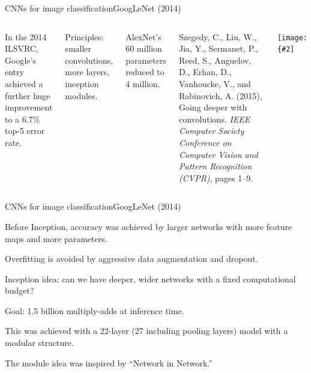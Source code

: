 \documentclass{beamer}
\newcommand{\myfig}[3]{\centerline{\texttt{[image: \{\#2]}}}
\begin{document}
\begin{frame}{CNNs for image classification}{GoogLeNet (2014)}

  \begin{columns}

    \column{3in}

    In the 2014 ILSVRC, Google's entry achieved a further huge
    improvement to a 6.7\% top-5 error rate.

    \medskip

    Principles: smaller convolutions, more layers, \alert{inception}
    modules.

    \medskip

    AlexNet's 60 million parameters reduced to 4 million.

    \medskip

    Szegedy, C., Liu, W., Jia, Y., Sermanet, P., 
    Reed, S., Anguelov, D., Erhan, D., Vanhoucke, V., and 
    Rabinovich, A. (2015), Going deeper with convolutions.
    \textit{IEEE Computer Society Conference on Computer Vision and Pattern
    Recognition (CVPR)}, pages 1--9.

    \column{1.5in}

    \myfig{0.6in}{szegedy-fig3}{Szegedy et al.\ (2014), Fig.\ 3}

  \end{columns}
  
\end{frame}


\begin{frame}{CNNs for image classification}{GoogLeNet (2014)}

  Before Inception, accuracy was achieved by larger networks with more
  feature maps and more parameters.

  \medskip

  Overfitting is avoided by aggressive data augmentation and dropout.

  \medskip

  Inception idea: can we have deeper, wider networks with a fixed computational
  budget?

  \medskip

  Goal: 1.5 billion multiply-adds at inference time.

  \medskip

  This was achieved with a 22-layer (27 including pooling layers)
  model with a modular structure.

  \medskip

  The module idea was inspired by ``Network in Network.''

\end{frame}
\end{document}

